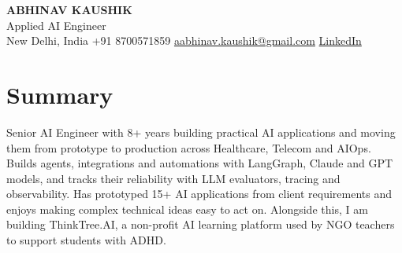 \documentclass[10pt,a4paper]{article}
\begin{document}
\begin{center}
  {\LARGE\bfseries ABHINAV KAUSHIK}\\[2pt]
  {\large Applied AI Engineer}\\[2pt]
  New Delhi, India \textbar{} +91 8700571859 \textbar{} \href{mailto:aabhinav.kaushik@gmail.com}{aabhinav.kaushik@gmail.com} \textbar{} \href{https://www.linkedin.com/in/abhinav-kaushik10/}{LinkedIn}  
\end{center}

\section{Summary}
Senior AI Engineer with 8+ years building practical AI applications and moving them from prototype to production across Healthcare, Telecom and AIOps. Builds agents, integrations and automations with LangGraph, Claude and GPT models, and tracks their reliability with LLM evaluators, tracing and observability. Has prototyped 15+ AI applications from client requirements and enjoys making complex technical ideas easy to act on. Alongside this, I am building ThinkTree.AI, a non-profit AI learning platform used by NGO teachers to support students with ADHD.
\end{document}
